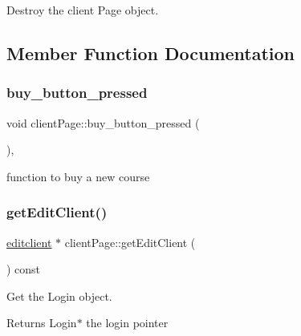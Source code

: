 Destroy the client Page object. 



\subsection{Member Function Documentation}
\mbox{\label{classclientPage_a4e6a1fa2748827eeebac3ec6ec8ca2b9}} 
\subsubsection{\texorpdfstring{buy\+\_\+button\+\_\+pressed}{buy\_button\_pressed}}
{\footnotesize\ttfamily void client\+Page\+::buy\+\_\+button\+\_\+pressed (\begin{DoxyParamCaption}{ }\end{DoxyParamCaption})\hspace{0.3cm}{\ttfamily [private]}, {\ttfamily [slot]}}



function to buy a new course 

\mbox{\label{classclientPage_aa61872884ea03691d0ac38db4d0d01cc}} 
\subsubsection{\texorpdfstring{get\+Edit\+Client()}{getEditClient()}}
{\footnotesize\ttfamily \hyperlink{classeditclient}{editclient} $\ast$ client\+Page\+::get\+Edit\+Client (\begin{DoxyParamCaption}{ }\end{DoxyParamCaption}) const}



Get the Login object. 

\begin{DoxyReturn}{Returns}
Login$\ast$ the login pointer 
\end{DoxyReturn}
\mbox{\label{classclientPage_ab2876735aef44d0e72f7a57820148a27}} 

